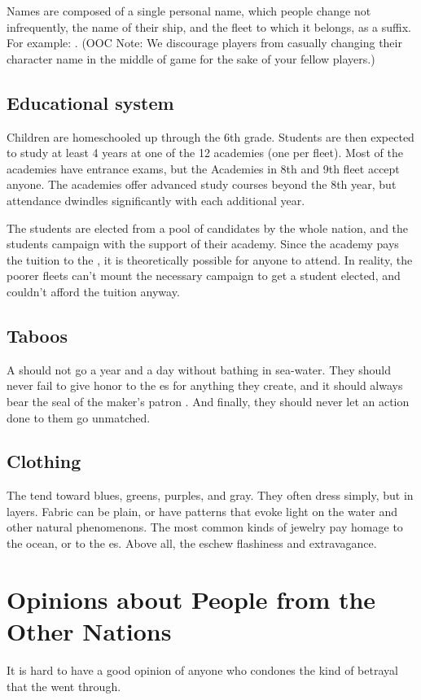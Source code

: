 \documentclass[blue]{GL2020}
\begin{document}
Names are composed of a single personal name, which people change not infrequently, the name of their ship, and the fleet to which it belongs, as a suffix. For example: \cLoud{\full}. (OOC Note: We discourage players from casually changing their character name in the middle of game for the sake of your fellow players.)

\subsection{Educational system}
Children are homeschooled up through the 6th grade. Students are then expected to study at least 4 years at one of the 12 academies (one per fleet). Most of the academies have entrance exams, but the Academies in 8th and 9th fleet accept anyone. The academies offer advanced study courses beyond the 8th year, but attendance dwindles significantly with each additional year.

The \pShip{} \pSchool{} students are elected from a pool of candidates by the whole nation, and the students campaign with the support of their academy. Since the academy pays the tuition to the \pSc{}, it is theoretically possible for anyone to attend. In reality, the poorer fleets can’t mount the necessary campaign to get a student elected, and couldn’t afford the tuition anyway.

\subsection*{Taboos}
A \pShippie{} should not go a year and a day without bathing in sea-water. They should never fail to give honor to the \cEbb{\God}es for anything they create, and it should always bear the seal of the maker’s patron \cEbb{\God}. And finally, they should never let an action done to them go unmatched.

\subsection{Clothing}
The \pShip{} tend toward blues, greens, purples, and gray. They often dress simply, but in layers. Fabric can be plain, or have patterns that evoke light on the water and other natural phenomenons. The most common kinds of jewelry pay homage to the ocean, or to the \cEbb{\God}es. Above all, the \pShippies{} eschew flashiness and extravagance.

\section*{Opinions about People from the Other Nations}
It is hard to have a good opinion of anyone who condones the kind of betrayal that the \pShip{} went through. 
\end{document}

